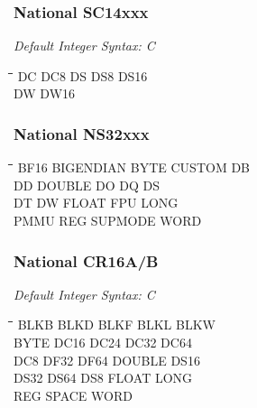 \subsubsection{National SC14xxx}

{\em Default Integer Syntax: C}

{\tt\begin{tabbing}
\hspace{3cm}\=\hspace{3cm}\=\hspace{3cm}\=\hspace{3cm}\=\kill
DC         \> DC8         \> DS          \> DS8         \> DS16 \\
DW         \> DW16 \\
\end{tabbing}}

\subsubsection{National NS32xxx}
{\tt\begin{tabbing}
\hspace{3cm}\=\hspace{3cm}\=\hspace{3cm}\=\hspace{3cm}\=\kill
BF16       \> BIGENDIAN   \> BYTE       \> CUSTOM       \> DB \\
DD         \> DOUBLE      \> DO         \> DQ           \> DS \\
DT         \> DW          \> FLOAT      \> FPU          \> LONG \\
PMMU       \> REG         \> SUPMODE    \> WORD \\
\end{tabbing}}

\subsubsection{National CR16A/B}

{\em Default Integer Syntax: C}

{\tt\begin{tabbing}
\hspace{3cm}\=\hspace{3cm}\=\hspace{3cm}\=\hspace{3cm}\=\kill
BLKB       \> BLKD        \> BLKF       \> BLKL         \> BLKW \\
BYTE       \> DC16        \> DC24       \> DC32         \> DC64 \\
DC8        \> DF32        \> DF64       \> DOUBLE       \> DS16 \\
DS32       \> DS64        \> DS8        \> FLOAT        \> LONG \\
REG        \> SPACE       \> WORD \\
\end{tabbing}}

